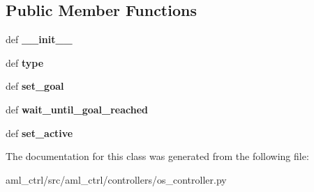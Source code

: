 \subsection*{Public Member Functions}
\begin{DoxyCompactItemize}
\item 
\hypertarget{classaml__ctrl_1_1controllers_1_1os__controller_1_1_o_s_controller_a45df7c8506ac273fa1fa4151d150bce6}{def {\bfseries \-\_\-\-\_\-init\-\_\-\-\_\-}}\label{classaml__ctrl_1_1controllers_1_1os__controller_1_1_o_s_controller_a45df7c8506ac273fa1fa4151d150bce6}

\item 
\hypertarget{classaml__ctrl_1_1controllers_1_1os__controller_1_1_o_s_controller_abfe6dd54b6461dfeedfec2d38c77f471}{def {\bfseries type}}\label{classaml__ctrl_1_1controllers_1_1os__controller_1_1_o_s_controller_abfe6dd54b6461dfeedfec2d38c77f471}

\item 
\hypertarget{classaml__ctrl_1_1controllers_1_1os__controller_1_1_o_s_controller_ac69f3c28e16ac763aa1368b8d8fb08ae}{def {\bfseries set\-\_\-goal}}\label{classaml__ctrl_1_1controllers_1_1os__controller_1_1_o_s_controller_ac69f3c28e16ac763aa1368b8d8fb08ae}

\item 
\hypertarget{classaml__ctrl_1_1controllers_1_1os__controller_1_1_o_s_controller_afbb13642219c803856fb69f8104e97fe}{def {\bfseries wait\-\_\-until\-\_\-goal\-\_\-reached}}\label{classaml__ctrl_1_1controllers_1_1os__controller_1_1_o_s_controller_afbb13642219c803856fb69f8104e97fe}

\item 
\hypertarget{classaml__ctrl_1_1controllers_1_1os__controller_1_1_o_s_controller_a84a896972570094acab46363b2338b1a}{def {\bfseries set\-\_\-active}}\label{classaml__ctrl_1_1controllers_1_1os__controller_1_1_o_s_controller_a84a896972570094acab46363b2338b1a}

\end{DoxyCompactItemize}


The documentation for this class was generated from the following file\-:\begin{DoxyCompactItemize}
\item 
aml\-\_\-ctrl/src/aml\-\_\-ctrl/controllers/os\-\_\-controller.\-py\end{DoxyCompactItemize}
